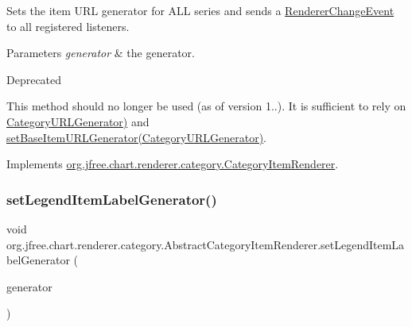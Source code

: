 Sets the item U\+RL generator for A\+LL series and sends a \mbox{\hyperlink{}{Renderer\+Change\+Event}} to all registered listeners.


\begin{DoxyParams}{Parameters}
{\em generator} & the generator.\\
\hline
\end{DoxyParams}
\begin{DoxyRefDesc}{Deprecated}
\item[\mbox{\hyperlink{deprecated__deprecated000152}{Deprecated}}]This method should no longer be used (as of version 1..). It is sufficient to rely on \mbox{\hyperlink{}{Category\+U\+R\+L\+Generator)}} and \mbox{\hyperlink{classorg_1_1jfree_1_1chart_1_1renderer_1_1category_1_1_abstract_category_item_renderer_a5164152d258bec58dcd516d7293e6ce8}{set\+Base\+Item\+U\+R\+L\+Generator(\+Category\+U\+R\+L\+Generator)}}. \end{DoxyRefDesc}


Implements \mbox{\hyperlink{interfaceorg_1_1jfree_1_1chart_1_1renderer_1_1category_1_1_category_item_renderer_ab208309306871c44b6ea1d85382d534e}{org.\+jfree.\+chart.\+renderer.\+category.\+Category\+Item\+Renderer}}.

\mbox{\label{classorg_1_1jfree_1_1chart_1_1renderer_1_1category_1_1_abstract_category_item_renderer_a59531e6a6ddc6c69540765b7d4e9a451}} 
\subsubsection{\texorpdfstring{set\+Legend\+Item\+Label\+Generator()}{setLegendItemLabelGenerator()}}
{\footnotesize\ttfamily void org.\+jfree.\+chart.\+renderer.\+category.\+Abstract\+Category\+Item\+Renderer.\+set\+Legend\+Item\+Label\+Generator (\begin{DoxyParamCaption}\item[{\mbox{\hyperlink{interfaceorg_1_1jfree_1_1chart_1_1labels_1_1_category_series_label_generator}{Category\+Series\+Label\+Generator}}}]{generator }\end{DoxyParamCaption})}

